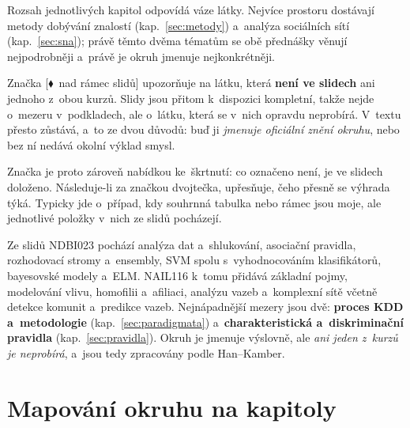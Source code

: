 \documentclass[11pt,a4paper]{article}
\theoremstyle{definition}
\newcommand{\mimo}{\textcolor{markcol}{\textsf{\footnotesize[$\blacklozenge$~nad rámec slidů]}}}
\begin{document}
\begin{center}
\begin{minipage}{0.92\textwidth}
\begin{poznbox}
\small
Rozsah jednotlivých kapitol odpovídá váze látky. Nejvíce prostoru dostávají metody dobývání
znalostí (kap.~\ref{sec:metody}) a~analýza sociálních sítí (kap.~\ref{sec:sna}); právě těmto
dvěma tématům se obě přednášky věnují nejpodrobněji a~právě je okruh jmenuje nejkonkrétněji.

Značka \mimo{} upozorňuje na látku, která \textbf{není ve slidech} ani jednoho z~obou kurzů.
Slidy jsou přitom k~dispozici kompletní, takže nejde o~mezeru v~podkladech, ale o~látku, která
se v~nich opravdu neprobírá. V~textu přesto zůstává, a~to ze dvou důvodů: buď ji
\emph{jmenuje oficiální znění okruhu}, nebo bez ní nedává okolní výklad smysl.

Značka je proto zároveň nabídkou ke~škrtnutí: co označeno není, je ve slidech doloženo.
Následuje-li za značkou dvojtečka, upřesňuje, čeho přesně se výhrada týká. Typicky jde
o~případ, kdy souhrnná tabulka nebo rámec jsou moje, ale jednotlivé položky v~nich ze slidů
pocházejí.

Ze slidů NDBI023 pochází analýza dat a~shlukování, asociační pravidla, rozhodovací stromy
a~ensembly, SVM spolu s~vyhodnocováním klasifikátorů, bayesovské modely a~ELM. NAIL116 k~tomu
přidává základní pojmy, modelování vlivu, homofilii a~afiliaci, analýzu vazeb a~komplexní sítě
včetně detekce komunit a~predikce vazeb. Nejnápadnější mezery jsou dvě:
\textbf{proces KDD a~metodologie} (kap.~\ref{sec:paradigmata}) a~\textbf{charakteristická
a~diskriminační pravidla} (kap.~\ref{sec:pravidla}). Okruh je jmenuje výslovně, ale
\emph{ani jeden z~kurzů je neprobírá}, a~jsou tedy zpracovány podle Han--Kamber.
\end{poznbox}
\end{minipage}
\end{center}

\vspace{2mm}

\section*{Mapování okruhu na kapitoly}
\end{document}

